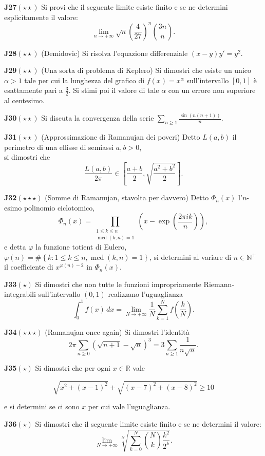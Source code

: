 \documentclass[a4paper,twoside]{article}
\renewcommand{\gcd}{\operatorname{mcd}}
\theoremstyle{definition}
\numberwithin{theorem}{section}
\begin{document}
\textbf{J27}$(\star\star)$ Si provi che il seguente limite esiste finito e se ne determini esplicitamente il valore:
$$ \lim_{n\to +\infty} \sqrt{n}\left(\frac{4}{27}\right)^n \binom{3n}{n}. $$

\textbf{J28}$(\star\star)$ (Demidovic) Si risolva l'equazione differenziale $(x-y)y'=y^2$.

\textbf{J29}$(\star\star)$ (Una sorta di problema di Keplero) Si dimostri che esiste un unico $\alpha > 1$ tale per cui la lunghezza del grafico di $f(x)=x^{\alpha}$ sull'intervallo $[0,1]$ è esattamente pari a $\frac{3}{2}$. Si stimi poi il valore di tale $\alpha$ con un errore non superiore al centesimo.

\textbf{J30}$(\star\star)$ Si discuta la convergenza della serie $\sum_{n\geq 1}\frac{\sin(n(n+1))}{n}$. 

\textbf{J31}$(\star\star)$ (Approssimazione di Ramanujan dei poveri) Detto $L(a,b)$ il perimetro di una ellisse di semiassi $a,b > 0$,\\ si dimostri che 
$$ \frac{L(a,b)}{2\pi}\in\left[\frac{a+b}{2},\sqrt{\frac{a^2+b^2}{2}}\right]. $$

\textbf{J32}$(\star\star\star)$ (Somme di Ramanujan, stavolta per davvero) Detto $\Phi_n(x)$ l'$n$-esimo polinomio ciclotomico, 
$$\Phi_n(x) = \prod_{\substack{1\leq k\leq n\\\gcd(k,n)=1}}\left(x-\exp\left(\frac{2\pi i k}{n}\right)\right),$$ e detta $\varphi$ la funzione totient di Eulero, $\varphi(n)=\#\left\{k:1\leq k\leq n, \gcd(k,n)=1\right\}$, si determini al variare di $n\in\mathbb{N}^+$\\ il coefficiente di $x^{\varphi(n)-2}$ in $\Phi_n(x)$.

\textbf{J33}$(\star)$ Si dimostri che non tutte le funzioni impropriamente Riemann-integrabili sull'intervallo $(0,1)$ realizzano l'uguaglianza
$$ \int_{0}^{1}f(x)\,dx = \lim_{N\to +\infty}\frac{1}{N}\sum_{k=1}^{N}f\left(\frac{k}{N}\right).$$

\textbf{J34}$(\star\star\star)$ (Ramanujan once again) Si dimostri l'identità
$$ 2\pi\sum_{n\geq 0}\left(\sqrt{n+1}-\sqrt{n}\right)^3 = 3\sum_{n\geq 1}\frac{1}{n\sqrt{n}}.$$

\textbf{J35}$(\star)$ Si dimostri che per ogni $x\in\mathbb{R}$ vale

$$ \sqrt{x^2+(x-1)^2}+\sqrt{(x-7)^2+(x-8)^2}\geq 10 $$

e si determini se ci sono $x$ per cui vale l'uguaglianza.

\textbf{J36}$(\star)$ Si dimostri che il seguente limite esiste finito e se ne determini il valore:
$$ \lim_{N\to +\infty}\sqrt[N]{\sum_{k=0}^{N}\binom{N}{k}\frac{k^2}{2^k}}.$$
\end{document}
